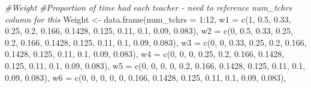 \documentclass[
]{book}
\newenvironment{Shaded}{\begin{snugshade}}{\end{snugshade}}
\newcommand{\AttributeTok}[1]{\textcolor[rgb]{0.77,0.63,0.00}{#1}}
\newcommand{\CommentTok}[1]{\textcolor[rgb]{0.56,0.35,0.01}{\textit{#1}}}
\newcommand{\DecValTok}[1]{\textcolor[rgb]{0.00,0.00,0.81}{#1}}
\newcommand{\FloatTok}[1]{\textcolor[rgb]{0.00,0.00,0.81}{#1}}
\newcommand{\FunctionTok}[1]{\textcolor[rgb]{0.00,0.00,0.00}{#1}}
\newcommand{\NormalTok}[1]{#1}
\newcommand{\OtherTok}[1]{\textcolor[rgb]{0.56,0.35,0.01}{#1}}
\newcommand{\SpecialCharTok}[1]{\textcolor[rgb]{0.00,0.00,0.00}{#1}}
\begin{document}
\begin{Shaded}
\begin{Highlighting}[]
\CommentTok{\#Weight}
\CommentTok{\#Proportion of time had each teacher {-} need to reference num\_tchrs column for this}
\NormalTok{Weight }\OtherTok{\textless{}{-}} \FunctionTok{data.frame}\NormalTok{(}\AttributeTok{num\_tchrs =} \DecValTok{1}\SpecialCharTok{:}\DecValTok{12}\NormalTok{,}
                     \AttributeTok{w1 =} \FunctionTok{c}\NormalTok{(}\DecValTok{1}\NormalTok{, }\FloatTok{0.5}\NormalTok{, }\FloatTok{0.33}\NormalTok{, }\FloatTok{0.25}\NormalTok{, }\FloatTok{0.2}\NormalTok{, }\FloatTok{0.166}\NormalTok{, }\FloatTok{0.1428}\NormalTok{, }\FloatTok{0.125}\NormalTok{, }\FloatTok{0.11}\NormalTok{, }\FloatTok{0.1}\NormalTok{, }\FloatTok{0.09}\NormalTok{, }\FloatTok{0.083}\NormalTok{),}
                     \AttributeTok{w2 =} \FunctionTok{c}\NormalTok{(}\DecValTok{0}\NormalTok{, }\FloatTok{0.5}\NormalTok{, }\FloatTok{0.33}\NormalTok{, }\FloatTok{0.25}\NormalTok{, }\FloatTok{0.2}\NormalTok{, }\FloatTok{0.166}\NormalTok{, }\FloatTok{0.1428}\NormalTok{, }\FloatTok{0.125}\NormalTok{, }\FloatTok{0.11}\NormalTok{, }\FloatTok{0.1}\NormalTok{, }\FloatTok{0.09}\NormalTok{, }\FloatTok{0.083}\NormalTok{),}
                     \AttributeTok{w3 =} \FunctionTok{c}\NormalTok{(}\DecValTok{0}\NormalTok{, }\DecValTok{0}\NormalTok{, }\FloatTok{0.33}\NormalTok{, }\FloatTok{0.25}\NormalTok{, }\FloatTok{0.2}\NormalTok{, }\FloatTok{0.166}\NormalTok{, }\FloatTok{0.1428}\NormalTok{, }\FloatTok{0.125}\NormalTok{, }\FloatTok{0.11}\NormalTok{, }\FloatTok{0.1}\NormalTok{, }\FloatTok{0.09}\NormalTok{, }\FloatTok{0.083}\NormalTok{),}
                     \AttributeTok{w4 =} \FunctionTok{c}\NormalTok{(}\DecValTok{0}\NormalTok{, }\DecValTok{0}\NormalTok{, }\DecValTok{0}\NormalTok{, }\FloatTok{0.25}\NormalTok{, }\FloatTok{0.2}\NormalTok{, }\FloatTok{0.166}\NormalTok{, }\FloatTok{0.1428}\NormalTok{, }\FloatTok{0.125}\NormalTok{, }\FloatTok{0.11}\NormalTok{, }\FloatTok{0.1}\NormalTok{, }\FloatTok{0.09}\NormalTok{, }\FloatTok{0.083}\NormalTok{),}
                     \AttributeTok{w5 =} \FunctionTok{c}\NormalTok{(}\DecValTok{0}\NormalTok{, }\DecValTok{0}\NormalTok{, }\DecValTok{0}\NormalTok{, }\DecValTok{0}\NormalTok{, }\FloatTok{0.2}\NormalTok{, }\FloatTok{0.166}\NormalTok{, }\FloatTok{0.1428}\NormalTok{, }\FloatTok{0.125}\NormalTok{, }\FloatTok{0.11}\NormalTok{, }\FloatTok{0.1}\NormalTok{, }\FloatTok{0.09}\NormalTok{, }\FloatTok{0.083}\NormalTok{),}
                     \AttributeTok{w6 =} \FunctionTok{c}\NormalTok{(}\DecValTok{0}\NormalTok{, }\DecValTok{0}\NormalTok{, }\DecValTok{0}\NormalTok{, }\DecValTok{0}\NormalTok{, }\DecValTok{0}\NormalTok{, }\FloatTok{0.166}\NormalTok{, }\FloatTok{0.1428}\NormalTok{, }\FloatTok{0.125}\NormalTok{, }\FloatTok{0.11}\NormalTok{, }\FloatTok{0.1}\NormalTok{, }\FloatTok{0.09}\NormalTok{, }\FloatTok{0.083}\NormalTok{),}

\end{Highlighting}
\end{Shaded}
\end{document}
